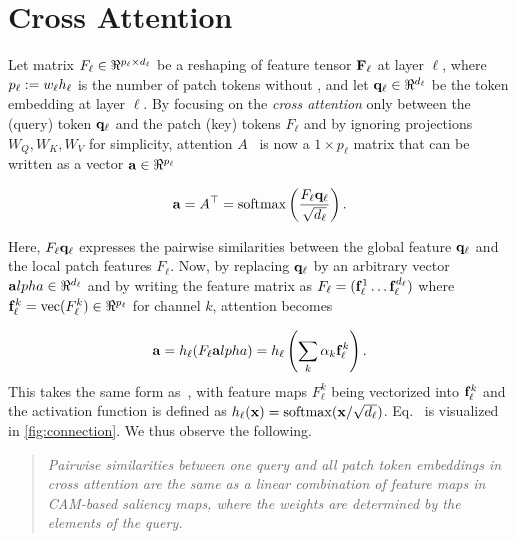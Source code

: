 \section {Cross Attention}
\label{sec:ca_defn}
Let matrix $F_\ell \in \real^{p_\ell \times d_\ell}$ be a reshaping of feature tensor $\mathbf{F}_\ell$ at
 layer $\ell$, where $p_\ell \mathrel{:=} w_\ell h_\ell$ is the number of patch tokens without \cls, and
  let $\vq_\ell \in \real^{d_\ell}$ be the \cls token embedding at layer $\ell$. By focusing on the 
  \emph{cross attention} only between the \cls (query) token $\mathbf{q}_\ell$ and the patch (key) tokens 
  $F_\ell$ and by ignoring projections $W_Q, W_K, W_V$ for simplicity, attention $A$~ 
  is now a $1 \times p_\ell$ matrix that can be written as a vector $\mathbf{a} \in \real^{p_\ell}$

\begin{equation}
	\mathbf{a} = A^\top = \operatorname{softmax} \left( \frac{F_\ell \mathbf{q}_\ell}{\sqrt{d_\ell}} \right).
\label{eq:cross-attention}
\end{equation}

Here, $F_\ell \mathbf{q}_\ell$ expresses the pairwise similarities between the global \cls feature 
$\mathbf{q}_\ell$ and the local patch features $F_\ell$. Now, by replacing $\mathbf{q}_\ell$ by an arbitrary vector 
$\mathbf{a}lpha \in \real^{d_\ell}$ and by writing the feature matrix as $F_\ell = (\mathbf{f}_\ell^1 \dots 
\mathbf{f}_\ell^{d_\ell})$ where $\vf_\ell^k = \vect(F_\ell^k) \in \real^{p_\ell}$ for channel $k$, 
attention  becomes

\begin{equation}
	\mathbf{a} = h_\ell (F_\ell \mathbf{a}lpha) =
		h_\ell \left( \sum_k \alpha_k \mathbf{f}_\ell^k \right).
\label{eq:connection}
\end{equation}
This takes the same form as~, with feature maps $F_\ell^k$ being vectorized into 
$\mathbf{f}_\ell^k$ and the activation function is defined as $h_\ell(\mathbf{x}) = \operatorname{softmax}(\mathbf{x} / \sqrt{d_\ell})$. 
Eq.~ is visualized in \autoref{fig:connection}. We thus observe the following.

\begin{quote}
	\emph{Pairwise similarities between one query and all patch token embeddings in cross attention 
	are the same as a linear combination of feature maps in CAM-based saliency maps, where the 
	weights are determined by the elements of the query.}
\end{quote}

